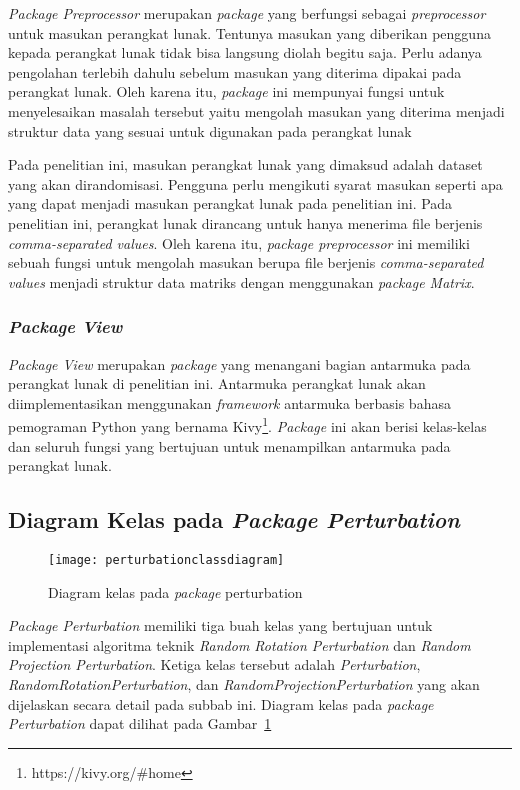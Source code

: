 \textit{Package Preprocessor} merupakan \textit{package} yang berfungsi sebagai \textit{preprocessor} untuk masukan perangkat lunak. Tentunya masukan yang diberikan pengguna kepada perangkat lunak tidak bisa langsung diolah begitu saja. Perlu adanya pengolahan terlebih dahulu sebelum masukan yang diterima dipakai pada perangkat lunak. Oleh karena itu, \textit{package} ini mempunyai fungsi untuk menyelesaikan masalah tersebut yaitu mengolah masukan yang diterima menjadi struktur data yang sesuai untuk digunakan pada perangkat lunak

Pada penelitian ini, masukan perangkat lunak yang dimaksud adalah dataset yang akan dirandomisasi. Pengguna perlu mengikuti syarat masukan seperti apa yang dapat menjadi masukan perangkat lunak pada penelitian ini. Pada penelitian ini, perangkat lunak dirancang untuk hanya menerima file berjenis \textit{comma-separated values}. Oleh karena itu, \textit{package preprocessor} ini memiliki sebuah fungsi untuk mengolah masukan berupa file berjenis \textit{comma-separated values} menjadi struktur data matriks dengan menggunakan \textit{package Matrix}.

\subsubsection{\textit{Package View}}
\label{subsubsec:package-view}

\textit{Package View} merupakan \textit{package} yang menangani bagian antarmuka pada perangkat lunak di penelitian ini. Antarmuka perangkat lunak akan diimplementasikan menggunakan \textit{framework} antarmuka berbasis bahasa pemograman Python yang bernama Kivy\footnote{https://kivy.org/\#home}. \textit{Package} ini akan berisi kelas-kelas dan seluruh fungsi yang bertujuan untuk menampilkan antarmuka pada perangkat lunak.

\subsection{Diagram Kelas pada \textit{Package Perturbation}}
\label{sec:diagram-kelas-perturbation}

\begin{figure}
	\centering
	\texttt{[image: perturbationclassdiagram]}
	\caption{Diagram kelas pada \textit{package} perturbation}
	\label{fig:perturbationclassdiagram}
\end{figure}

\textit{Package Perturbation} memiliki tiga buah kelas yang bertujuan untuk implementasi algoritma teknik \textit{Random Rotation Perturbation} dan \textit{Random Projection Perturbation}. Ketiga kelas tersebut adalah \textit{Perturbation}, \textit{RandomRotationPerturbation}, dan \textit{RandomProjectionPerturbation} yang akan dijelaskan secara detail pada subbab ini. Diagram kelas pada \textit{package Perturbation} dapat dilihat pada Gambar~\ref{fig:perturbationclassdiagram}


